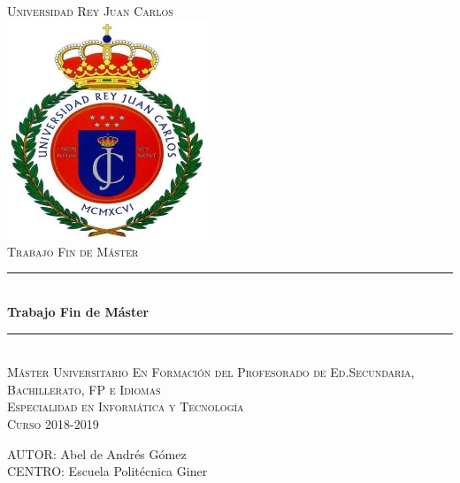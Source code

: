 \documentclass[spanish,12pt, a4paper,twoside]{paper}
\begin{document}
\begin{titlepage}

\newcommand{\HRule}{\rule{\linewidth}{0.5mm}} %




\center %
\vspace*{5pt}
\textsc{\huge Universidad Rey Juan Carlos }
\\[2cm]

\includegraphics[width=6cm]{recursos/escudo_urjc}
\\[2cm]

\textsc{\Large Trabajo Fin de Máster }\\[0.2cm]
\HRule \\[0.4cm]
{ \huge \bfseries Trabajo Fin de Máster}\\[0.2cm] %
\HRule \\[1.5cm]

\textsc{\Large Máster Universitario En Formación del Profesorado de Ed.Secundaria, Bachillerato, FP e Idiomas }\\[0.7cm]
\textsc{\Large Especialidad en Informática y Tecnología }\\[1cm]
\textsc{\Large Curso 2018-2019}\\[2cm]

\begin{flushright}
	\large
	AUTOR: Abel de Andrés Gómez\\
	CENTRO: Escuela Politécnica Giner\linebreak
\end{flushright}

\vspace{1cm}

\vfill %

\end{titlepage}
\end{document}
